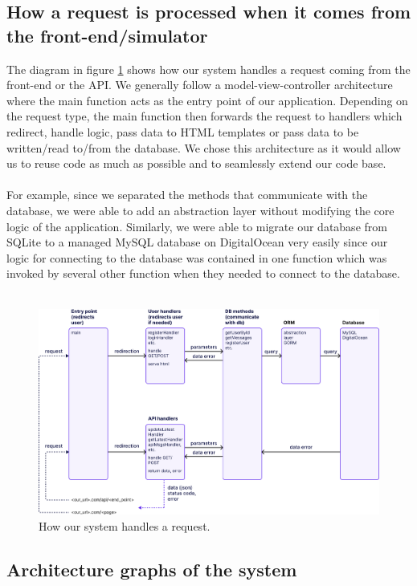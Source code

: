 \documentclass{article}
\begin{document}
\subsection{How a request is processed when it comes from the front-end/simulator}
The diagram in figure \ref{fig:request_pipeline} shows how our system handles a request coming from the front-end or the API. We generally follow a model-view-controller architecture where the main function acts as the entry point of our application. Depending on the request type, the main function then forwards the request to handlers which redirect, handle logic, pass data to HTML templates or pass data to be written/read to/from the database. We chose this architecture as it would allow us to reuse code as much as possible and to seamlessly extend our code base. 
\\\\
For example, since we separated the methods that communicate with the database, we were able to add an abstraction layer without modifying the core logic of the application. Similarly, we were able to migrate our database from SQLite to a managed MySQL database on DigitalOcean very easily since our logic for connecting to the database was contained in one function which was invoked by several other function when they needed to connect to the database.
\\\\
\begin{figure}[ht]
    \centering
    \includegraphics[width=1.0\textwidth]{./images/request_pipeline_v2.png}
    \caption{How our system handles a request.}
    \label{fig:request_pipeline}
\end{figure}

\subsection{Architecture graphs of the system}
\end{document}

